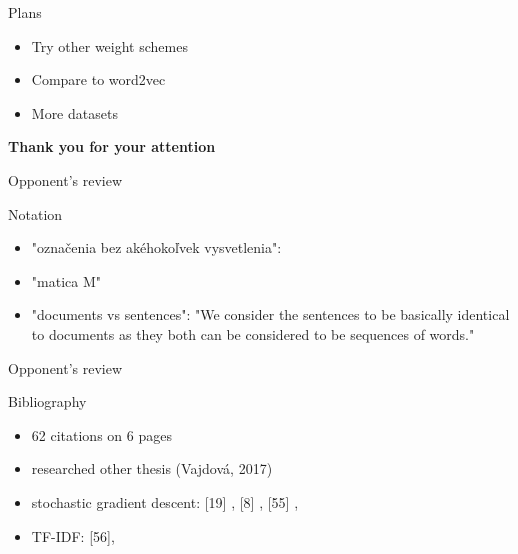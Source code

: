 \documentclass[xcolor={table}]{beamer}
\begin{document}
\begin{frame}{Plans}
    \begin{block}{}
        \begin{itemize}   
            \item Try other weight schemes
            \item Compare to word2vec
            \item More datasets 
        \end{itemize}
    \end{block}
\end{frame} 


\begin{frame}
    \vfill
    \begin{center}
        \huge\bfseries
        Thank you for your attention
        \vfill
    \end{center}
    \vfill
\end{frame}




\begin{frame}{Opponent's review}
    \begin{block}{Notation}
        \begin{itemize}   
            \item "označenia bez akéhokoľvek vysvetlenia":
            \item "matica M" %
            \item "documents vs sentences": "We consider the sentences to be basically identical to documents as they both
can be considered to be sequences of words."            
             
        \end{itemize}
    \end{block}
\end{frame} 

\begin{frame}{Opponent's review}
    \begin{block}{Bibliography}
        \begin{itemize}   
            \item 62 citations on 6 pages
            \item researched other thesis (Vajdová, 2017)
            \item stochastic gradient descent: [19] \cite{Goodfellow-et-al-2016},  [8] \cite{bottou-bousquet-2008},
            [55] \cite{rumelhart1986david},  %
            \item TF-IDF: [56], \cite{salton1988term}
        \end{itemize}
    \end{block}
\end{frame} 
\end{document}

